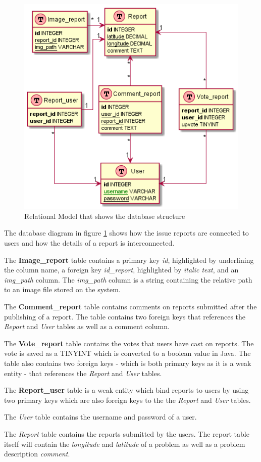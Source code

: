 \begin{figure}[hbt]
\centering
\includegraphics[width=.6\textwidth]{images/relational_model}
\caption{Relational Model that shows the database structure}\label{fig:database_diagram}
\end{figure}

The database diagram in figure \ref{fig:database_diagram} shows how the issue reports are connected to users and how the details of a report is interconnected. 

The \textbf{Image\_report} table contains a primary key \textit{id}, highlighted by underlining the column name, a foreign key \textit{id\_report}, highlighted by \textit{italic text}, and an \textit{img\_path} column. The \textit{img\_path} column is a string containing the relative path to an image file stored on the system. 

The \textbf{Comment\_report} table contains comments on reports submitted after the publishing of a report. The table contains two foreign keys that references the \textit{Report} and \textit{User} tables as well as a comment column.

The \textbf{Vote\_report} table contains the votes that users have cast on reports. The vote is saved as a TINYINT which is converted to a boolean value in Java. The table also contains two foreign keys - which is both primary keys as it is a weak entity - that references the \textit{Report} and \textit{User} tables.

The \textbf{Report\_user} table is a weak entity which bind reports to users by using two primary keys which are also foreign keys to the the \textit{Report} and \textit{User} tables.

The \textit{User} table contains the username and password of a user.

The \textit{Report} table contains the reports submitted by the users. The report table itself will contain the \textit{longitude} and \textit{latitude} of a problem as well as a problem description \textit{comment}.

